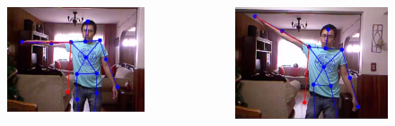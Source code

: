 \documentclass{beamer}
\begin{document}

\begin{frame}


\begin{columns}[c] %

\begin{figure}
\includegraphics[width=0.9\linewidth]{comp1.png}
\end{figure}


\begin{figure}
\includegraphics[width=0.9\linewidth]{comp2.png}
\end{figure}

\end{columns}



\end{frame}
\end{document}
